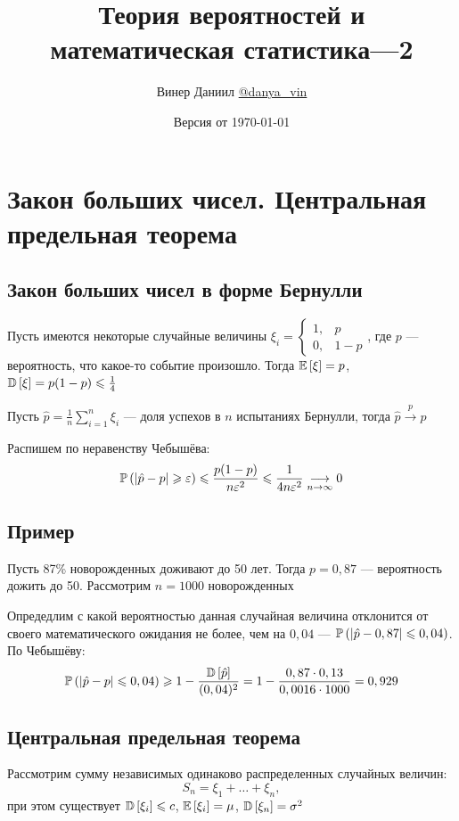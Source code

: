 \documentclass[a4paper, 10pt]{article}
\title{\LARGE{Теория вероятностей и математическая статистика—2}}
\author{Винер Даниил  \href{https://t.me/danya_vin}{@danya\_vin}}
\date{Версия от \today}
\begin{document}
\maketitle
\tableofcontents
\setlength{\parindent}{15pt}
\setlength{\parskip}{2mm}
\newpage
\section{Закон больших чисел. Центральная предельная теорема}
\subsection{Закон больших чисел в форме Бернулли}
Пусть имеются некоторые случайные величины $\xi_i=\begin{cases}
    1,&p\\
    0,&1-p
\end{cases}$, где $p$ — вероятность, что какое-то событие произошло. Тогда $\mathbb{E}\left[\xi\right]=p$, $\mathbb{D}\left[\xi\right]=p(1-p)\leqslant \frac{1}{4}$

\theorem Пусть $\hat{p}=\frac{1}{n}\sum_{i=1}^{n} \xi_i$ — доля успехов в $n$ испытаниях Бернулли, тогда $\hat{p}\overset{p}{\longrightarrow} p$

\proof Распишем по неравенству Чебышёва: 
\begin{equation*}
    \mathbb{P}\left(|\hat{p}-p|\geqslant\varepsilon\right)\leqslant\frac{p(1-p)}{n\varepsilon^2}\leqslant \frac{1}{4n\varepsilon^2}\underset{n\to\infty}{\longrightarrow}0
\end{equation*}

\subsection*{Пример}
Пусть 87\% новорожденных доживают до 50 лет. Тогда $p=0,87$ — вероятность дожить до 50. Рассмотрим $n=1000$ новорожденных

Опредедлим с какой вероятностью данная случайная величина отклонится от своего математического ожидания не более, чем на $0,04$ — $\mathbb{P}\left(|\hat{p}-0,87|\leqslant 0,04\right)$. По Чебышёву:
\begin{equation*}
    \mathbb{P}\left(|\hat{p}-p|\leqslant 0,04\right)\geqslant1-\frac{\mathbb{D}\left[\hat{p}\right]}{(0,04)^2}=1-\frac{0,87\cdot0,13}{0,0016\cdot1000}=0,929
\end{equation*}

\subsection{Центральная предельная теорема}
Рассмотрим сумму независимых одинаково распределенных случайных величин:
\begin{equation*}
    S_n=\xi_1+\ldots+\xi_n,
\end{equation*}
при этом существует $\mathbb{D}\left[\xi_i\right]\leqslant c$, $\mathbb{E}\left[\xi_i\right]=\mu$, $\mathbb{D}\left[\xi_n\right]=\sigma^2$
\end{document}
